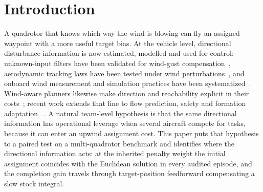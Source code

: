 \section{Introduction}
A quadrotor that knows which way the wind is blowing can fly an assigned waypoint
with a more useful target bias. At the
vehicle level, directional disturbance information is now estimated, modelled and
used for control: unknown-input filters have been validated for wind-gust
compensation~\cite{azid2021windgust}, aerodynamic tracking laws have been tested
under wind perturbations~\cite{perozzi2018wind}, and onboard wind measurement and
simulation practices have been systematized~\cite{abichandani2020wind,wi2024windstress,
wetz2021distributed,schiano2014wind,gonzalezrocha2019sensingwind,
wang2018windestimation}.
Wind-aware planners likewise make direction and reachability explicit in their
costs~\cite{thanellas2019spatialwind,heidari2021windplanning,techy2009minimum};
recent work extends that line to flow prediction, safety and formation adaptation
~\cite{seal2025,wespr2026,knodedw2025}. A natural team-level hypothesis is that
the same directional information has operational leverage when several aircraft
compete for tasks, because it can enter an upwind assignment cost. This paper
puts that hypothesis to a paired test on a multi-quadrotor benchmark and
identifies where the directional information acts: at the inherited penalty
weight the initial assignment coincides with the Euclidean solution in every
audited episode, and the completion gain travels through target-position
feedforward compensating a slow stock integral.

